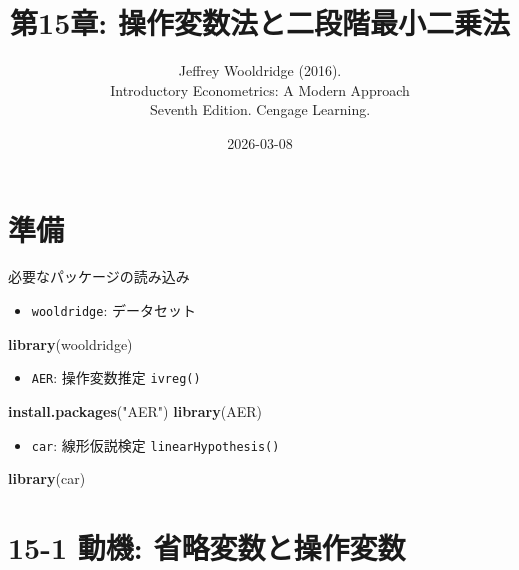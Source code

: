 \documentclass[
  ignorenonframetext,
]{beamer}
\title{第15章: 操作変数法と二段階最小二乗法}
\subtitle{Jeffrey Wooldridge (2016).\\
Introductory Econometrics: A Modern Approach\\
Seventh Edition. Cengage Learning.}
\author{}
\date{\vspace{-2.5em}2026-03-08}
\newenvironment{Shaded}{\begin{snugshade}}{\end{snugshade}}
\newcommand{\FunctionTok}[1]{\textcolor[rgb]{0.13,0.29,0.53}{\textbf{#1}}}
\newcommand{\NormalTok}[1]{#1}
\newcommand{\StringTok}[1]{\textcolor[rgb]{0.31,0.60,0.02}{#1}}
\providecommand{\tightlist}{%
  \setlength{\itemsep}{0pt}\setlength{\parskip}{0pt}}
\begin{document}
\frame{\titlepage}

\section{準備}\label{ux6e96ux5099}

\begin{frame}[fragile]{必要なパッケージの読み込み}
\label{ux5fc5ux8981ux306aux30d1ux30c3ux30b1ux30fcux30b8ux306eux8aadux307fux8fbcux307f}
\begin{itemize}
\tightlist
\item
  \texttt{wooldridge}: データセット
\end{itemize}

\begin{Shaded}
\begin{Highlighting}[]
\FunctionTok{library}\NormalTok{(wooldridge)}
\end{Highlighting}
\end{Shaded}

\begin{itemize}
\tightlist
\item
  \texttt{AER}: 操作変数推定 \texttt{ivreg()}
\end{itemize}

\begin{Shaded}
\begin{Highlighting}[]
\FunctionTok{install.packages}\NormalTok{(}\StringTok{"AER"}\NormalTok{)}
\FunctionTok{library}\NormalTok{(AER)}
\end{Highlighting}
\end{Shaded}

\begin{itemize}
\tightlist
\item
  \texttt{car}: 線形仮説検定 \texttt{linearHypothesis()}
\end{itemize}

\begin{Shaded}
\begin{Highlighting}[]
\FunctionTok{library}\NormalTok{(car)}
\end{Highlighting}
\end{Shaded}
\end{frame}

\section{15-1 動機:
省略変数と操作変数}\label{ux52d5ux6a5f-ux7701ux7565ux5909ux6570ux3068ux64cdux4f5cux5909ux6570}
\end{document}
